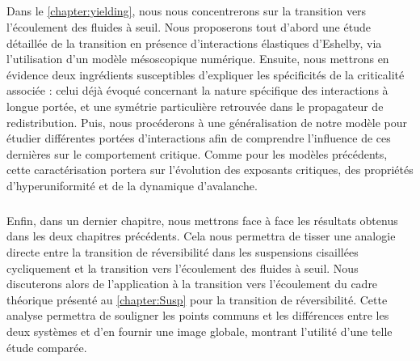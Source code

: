 \subparagraph{}Dans le \autoref{chapter:yielding}, nous nous concentrerons sur la transition vers l'écoulement des fluides à seuil. Nous proposerons tout d'abord une étude détaillée de la transition en présence d'interactions élastiques d'Eshelby, via l'utilisation d'un modèle mésoscopique numérique. Ensuite, nous mettrons en évidence deux ingrédients susceptibles d'expliquer les spécificités de la criticalité associée : celui déjà évoqué concernant la nature spécifique des interactions à longue portée, et une symétrie particulière retrouvée dans le propagateur de redistribution. Puis, nous procéderons à une généralisation de notre modèle pour étudier différentes portées d'interactions afin de comprendre l'influence de ces dernières sur le comportement critique. Comme pour les modèles précédents, cette caractérisation portera sur l'évolution des exposants critiques, des propriétés d'hyperuniformité et de la dynamique d'avalanche.

\subparagraph{}Enfin, dans un dernier chapitre, nous mettrons face à face les résultats obtenus dans les deux chapitres précédents. Cela nous permettra de tisser une analogie directe entre la transition de réversibilité dans les suspensions cisaillées cycliquement et la transition vers l'écoulement des fluides à seuil. Nous discuterons alors de l'application à la transition vers l'écoulement du cadre théorique présenté au \autoref{chapter:Susp} pour la transition de réversibilité. Cette analyse permettra de souligner les points communs et les différences entre les deux systèmes et d'en fournir une image globale, montrant l'utilité d'une telle étude comparée.